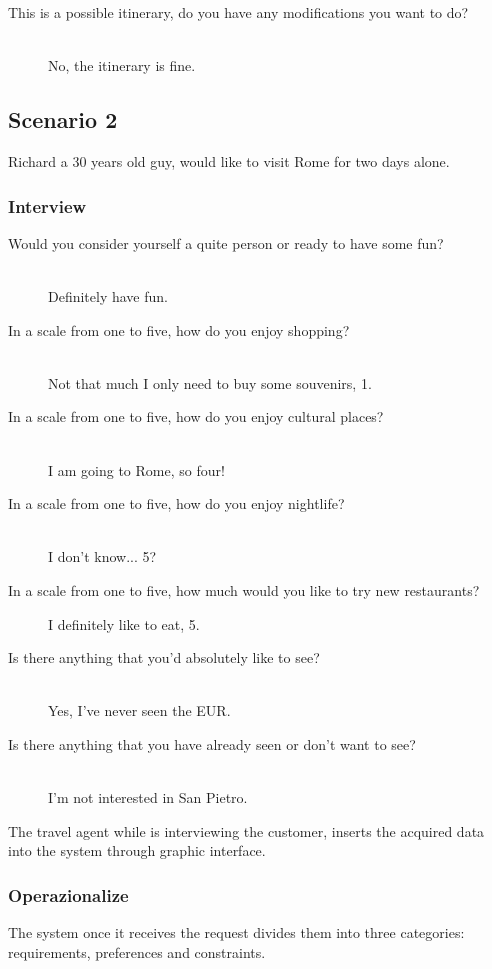 \documentclass[11pt]{article} %
\begin{document}
\begin{description}
  \item[This is a possible itinerary, do you have any modifications you want to do?] \hfill \\
  No, the itinerary is fine.
\end{description}

\subsection{Scenario 2}
Richard a 30 years old guy, would like to visit Rome for two days alone.

\subsubsection{Interview} 

\begin{description}
  \item[Would you consider yourself a quite person or ready to have some fun?] \hfill \\
  Definitely have fun.
  \item[In a scale from one to five, how do you enjoy shopping?] \hfill \\
  Not that much I only need to buy some souvenirs, 1.
  \item[In a scale from one to five, how do you enjoy cultural places?] \hfill \\
  I am going to Rome, so four!
  \item[In a scale from one to five, how do you enjoy nightlife?] \hfill \\
  I don't know... 5?
  \item[In a scale from one to five, how much would you like to try new restaurants?] \hfill 
  I definitely like to eat, 5.
  \item[Is there anything that you'd absolutely like to see?] \hfill \\
  Yes, I've never seen the EUR.
  \item[Is there anything that you have already seen or don't want to see?] \hfill \\
  I'm not interested in San Pietro.
\end{description}

The travel agent while is interviewing the customer, inserts the acquired data into the system through graphic interface.

\subsubsection{Operazionalize}
The system once it receives the request divides them into three categories: requirements, preferences and constraints.
\end{document}
